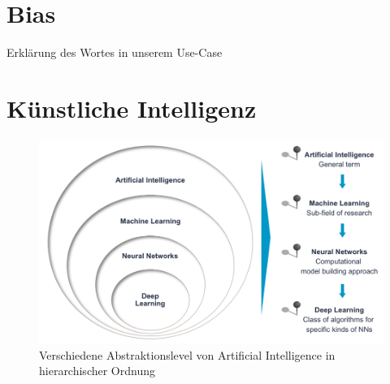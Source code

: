 \documentclass[12pt,oneside,a4paper,parskip]{scrbook}
\begin{document}
\section{Bias}
Erklärung des Wortes in unserem Use-Case

\section{Künstliche Intelligenz}

\begin{figure}[ht]
	\begin{center}
		\includegraphics[width=12cm]{Bilder/Abstraktionslevel_von_AI.jpg}
		\caption{Verschiedene Abstraktionslevel von Artificial Intelligence in hierarchischer Ordnung}
		\label{fig:Übersicht}
	\end{center}
\end{figure}
\end{document}
